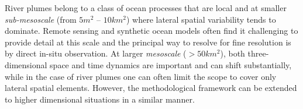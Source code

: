 \documentclass[aoas]{imsart}
\begin{document}




River plumes belong to a class of ocean processes that are local and
at smaller \emph{sub-mesoscale} (from $5 m^2$ -- $10 km^2$) where
lateral spatial variability tends to dominate. Remote sensing and
synthetic ocean models often find it challenging to provide detail at
this scale \citep{Lermusiaux:2006} and the principal way to resolve
for fine resolution is by direct in-situ observation. At larger
\emph{mesoscale} ($>50 km^2$), both three-dimensional space and time
dynamics are important and can shift substantially, while in the case
of river plumes one can often limit the scope to cover only lateral
spatial elements. However, the methodological framework can be
extended to higher dimensional situations in a similar manner.
\end{document}
